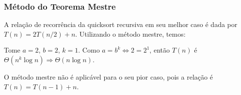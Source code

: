 \subsubsection{Método do Teorema Mestre}

A relação de recorrência da quicksort recursiva em seu melhor caso é dada por \( T(n) = 2T(n/2) + n \). Utilizando o método mestre, temos:

Tome \( a = 2 \), \( b = 2 \), \( k = 1 \). Como \( a = b^k \Leftrightarrow 2 = 2^1 \), então \( T(n) \) é \( \Theta(n^k \log{n}) \Rightarrow \Theta(n \log{n}) \).

O método mestre não é aplicável para o seu pior caso, pois a relação é \( T(n) = T(n-1) + n \).
